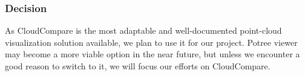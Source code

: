 \subsubsection{Decision}
As CloudCompare is the most adaptable and well-documented point-cloud visualization solution available, we plan to use it for our project. 
Potree viewer may become a more viable option in the near future, but unless we encounter a good reason to switch to it, we will focus our efforts on CloudCompare. 
